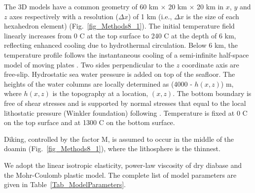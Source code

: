 The 3D models have a common geometry of 60 km $\times$ 20 km $\times$ 20 km in $x$, $y$ and $z$ axes respectively with a resolution ($\Delta x$) of 1 km (i.e., $\Delta x$ is the size of each hexahedron element) (Fig.~\ref{fig_Methods8_1}). %
The initial temperature field linearly increases from 0 \degree C at the top surface to 240 \degree C at the depth of 6 km, reflecting enhanced cooling due to hydrothermal circulation. Below 6 km, the temperature profile follows the instantaneous cooling of a semi-infinite half-space model of moving plates \citep[e.g.,][]{Turcotte2002}. Two sides perpendicular to the $z$ coordinate axis are free-slip. Hydrostatic sea water pressure is added on top of the seafloor. The heights of the water columns are locally determined as (4000 - $h(x,z)$) m, where $h(x,z)$ is the topography at a location, $(x,z)$. The bottom boundary is free of shear stresses and is supported by normal stresses that equal to the local lithostatic pressure (Winkler foundation) following \citet{Buck2005}. Temperature is fixed at 0 \degree C on the top surface and at 1300 \degree C on the bottom surface. 

Diking, controlled by the factor M, is assumed to occur in the middle of the doamin (Fig.~\ref{fig_Methods8_1}), where the lithosphere is the thinnest.

We adopt the linear isotropic elasticity, power-law viscosity of dry diabase \citep[e.g.,][]{Kirby1987, Buck2005} and the Mohr-Coulomb plastic model. The complete list of model parameters are given in Table~\hyperref[Tab_ModelParameters]{\ref{Tab_ModelParameters}}.

